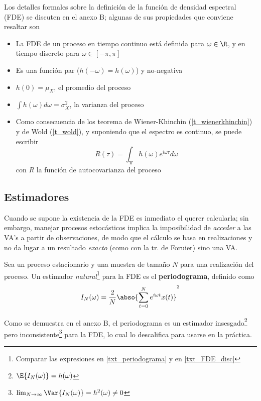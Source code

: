 Los detalles formales sobre la definición de la función de densidad espectral (FDE) se discuten en 
el anexo B; algunas de sus propiedades que conviene resaltar son 
\begin{itemize}
\item La FDE de un proceso en tiempo continuo está definida para $\omega \in \R$, y en tiempo
discreto para $\omega \in [-\pi,\pi]$
\item Es una función par ($h(-\omega) = h(\omega)$) y no-negativa
\item $h(0) = \mu_X$, el promedio del proceso
\item $\int h(\omega) d\omega = \sigma^{2}_X$, la varianza del proceso %
\item Como consecuencia de los teorema de Wiener-Khinchin (\ref{t_wienerkhinchin}) y de Wold
(\ref{t_wold}), y suponiendo que el espectro es continuo, se puede escribir
\begin{equation}
R(\tau) = \int_{\boldsymbol{T}} h(\omega) e^{i \omega \tau} d\omega
\label{txt_r_ft_h}
\end{equation}
con $R$ la función de autocovarianza del proceso
\end{itemize}


\subsection{Estimadores}

Cuando se supone la existencia de la FDE es inmediato el querer calcularla; sin embargo, manejar 
procesos estocásticos implica la imposibilidad de \textit{acceder} a las VA's a partir de 
observaciones, de modo que el cálculo se basa en realizaciones y no da lugar a un resultado 
\textit{exacto} (como con la tr. de Foruier) sino una VA.

Sea \xt un proceso estacionario y \xtd una muestra de tamaño $N$ para una realización del proceso.
%
Un estimador \textit{natural}\footnote{Comparar las expresiones en \ref{txt_periodograma} y en 
\ref{txt_FDE_disc}} para la FDE es el \textbf{periodograma}, definido como
\begin{equation}
I_N(\omega) = \frac{2}{N} \abso{\sum_{t = 0}^{N} e^{i \omega t} x(t)}^{2}
\label{txt_periodograma}
\end{equation}

Como se demuestra en el anexo B, el periodograma es un estimador 
insesgado\footnote{$\E{I_N(\omega)}=h(\omega)$} pero 
inconsistente\footnote{$\lim_{N\rightarrow\infty} \Var{I_N(\omega)} = h^{2}(\omega) \neq 0$} para
la FDE, lo cual lo descalifica para usarse en la práctica.

